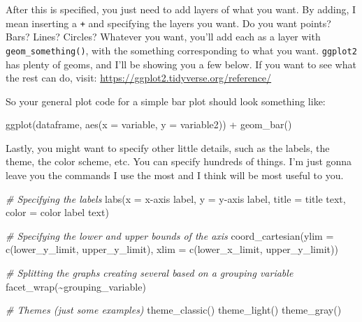 \documentclass[
]{book}
\newenvironment{Shaded}{\begin{snugshade}}{\end{snugshade}}
\newcommand{\AttributeTok}[1]{\textcolor[rgb]{0.77,0.63,0.00}{#1}}
\newcommand{\CommentTok}[1]{\textcolor[rgb]{0.56,0.35,0.01}{\textit{#1}}}
\newcommand{\FunctionTok}[1]{\textcolor[rgb]{0.00,0.00,0.00}{#1}}
\newcommand{\NormalTok}[1]{#1}
\newcommand{\SpecialCharTok}[1]{\textcolor[rgb]{0.00,0.00,0.00}{#1}}
\newcommand{\StringTok}[1]{\textcolor[rgb]{0.31,0.60,0.02}{#1}}
\begin{document}
After this is specified, you just need to add layers of what you want.
By adding, I mean inserting a \texttt{+} and specifying the layers you want.
Do you want points?
Bars?
Lines?
Circles?
Whatever you want, you'll add each as a layer with \texttt{geom\_something()}, with the something corresponding to what you want.
\texttt{ggplot2} has plenty of geoms, and I'll be showing you a few below.
If you want to see what the rest can do, visit: \url{https://ggplot2.tidyverse.org/reference/}

So your general plot code for a simple bar plot should look something like:

\begin{Shaded}
\begin{Highlighting}[]
\FunctionTok{ggplot}\NormalTok{(dataframe, }\FunctionTok{aes}\NormalTok{(}\AttributeTok{x =}\NormalTok{ variable, }\AttributeTok{y =}\NormalTok{ variable2)) }\SpecialCharTok{+}
  \FunctionTok{geom\_bar}\NormalTok{()}
\end{Highlighting}
\end{Shaded}

Lastly, you might want to specify other little details, such as the labels, the theme, the color scheme, etc.
You can specify hundreds of things.
I'm just gonna leave you the commands I use the most and I think will be most useful to you.

\begin{Shaded}
\begin{Highlighting}[]
\CommentTok{\# Specifying the labels}
\FunctionTok{labs}\NormalTok{(}\AttributeTok{x =} \StringTok{\textquotesingle{}x{-}axis label\textquotesingle{}}\NormalTok{, }\AttributeTok{y =} \StringTok{\textquotesingle{}y{-}axis label\textquotesingle{}}\NormalTok{, }\AttributeTok{title =} \StringTok{\textquotesingle{}title text\textquotesingle{}}\NormalTok{, }\AttributeTok{color =} \StringTok{\textquotesingle{}color label text\textquotesingle{}}\NormalTok{)}

\CommentTok{\# Specifying the lower and upper bounds of the axis}
\FunctionTok{coord\_cartesian}\NormalTok{(}\AttributeTok{ylim =} \FunctionTok{c}\NormalTok{(}\StringTok{\textquotesingle{}lower\_y\_limit\textquotesingle{}}\NormalTok{, }\StringTok{\textquotesingle{}upper\_y\_limit\textquotesingle{}}\NormalTok{),}
                \AttributeTok{xlim =} \FunctionTok{c}\NormalTok{(}\StringTok{\textquotesingle{}lower\_x\_limit\textquotesingle{}}\NormalTok{, }\StringTok{\textquotesingle{}upper\_y\_limit\textquotesingle{}}\NormalTok{))}

\CommentTok{\# Splitting the graphs creating several based on a grouping variable}
\FunctionTok{facet\_wrap}\NormalTok{(}\SpecialCharTok{\textasciitilde{}}\StringTok{\textquotesingle{}grouping\_variable\textquotesingle{}}\NormalTok{)}

\CommentTok{\# Themes (just some examples)}
\FunctionTok{theme\_classic}\NormalTok{()}
\FunctionTok{theme\_light}\NormalTok{()}
\FunctionTok{theme\_gray}\NormalTok{()}
\end{Highlighting}
\end{Shaded}
\end{document}
